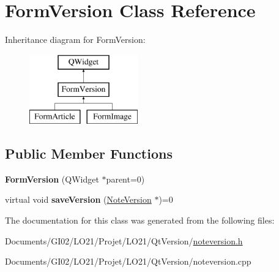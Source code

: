 \hypertarget{class_form_version}{}\section{Form\+Version Class Reference}
\label{class_form_version}
Inheritance diagram for Form\+Version\+:\begin{figure}[H]
\begin{center}
\leavevmode
\includegraphics[height=3.000000cm]{class_form_version}
\end{center}
\end{figure}
\subsection*{Public Member Functions}
\begin{DoxyCompactItemize}
\item 
\mbox{\label{class_form_version_a8a9de9f27b5558bd1a5b89a076194bea}} 
{\bfseries Form\+Version} (Q\+Widget $\ast$parent=0)
\item 
\mbox{\label{class_form_version_a11ab533de81b0930aa8c5e7e53328629}} 
virtual void {\bfseries save\+Version} (\hyperlink{class_note_version}{Note\+Version} $\ast$)=0
\end{DoxyCompactItemize}


The documentation for this class was generated from the following files\+:\begin{DoxyCompactItemize}
\item 
Documents/\+G\+I02/\+L\+O21/\+Projet/\+L\+O21/\+Qt\+Version/\hyperlink{noteversion_8h}{noteversion.\+h}\item 
Documents/\+G\+I02/\+L\+O21/\+Projet/\+L\+O21/\+Qt\+Version/noteversion.\+cpp\end{DoxyCompactItemize}
